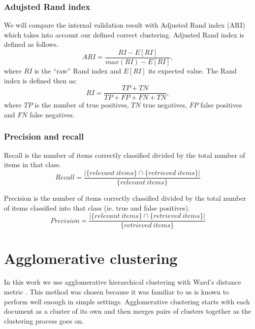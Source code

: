 \subsubsection{Adujsted Rand index}
We will compare the internal validation result with Adjusted Rand 
index (ARI) \cite{hubert_comparing_1985} which takes into account 
our defined correct clustering. Adjusted Rand index is defined as 
follows.
\begin{equation}
 ARI = \frac{RI - E[RI]}{max(RI) - E[RI]},
\end{equation}
where $RI$ is the ``raw'' Rand index and $E[RI]$ its expected
value. The Rand index is defined then as:
\begin{equation}
  RI = \frac{TP + TN}{TP + FP + FN + TN},
\end{equation}
where $TP$ is the number of true positives, $TN$ true negatives, 
$FP$ false positives and $FN$ false negatives.

\subsubsection{Precision and recall}
Recall is the number of items correctly classified divided by the 
total number of items in that class.
\begin{equation}
 Recall = \frac{|\{relevant\ items\} \cap \{retrieved\ items\}|} 
{\{relevant\ items\}}
\end{equation}

Precision is the number of items correctly classified divided by 
the total number of items classified into that class (ie. true and 
false positives).
\begin{equation}
 Precision = \frac{|\{relevant\ items\} \cap \{retrieved\ 
items\}|} 
{\{retrieved\ items\}}
\end{equation}


\section{Agglomerative clustering}
\label{sec:agglomerativeclustering}
In this work we use agglomerative hierarchical clustering with 
Ward's distance metric \cite{ward_jr_hierarchical_1963}. This 
method was chosen because it was familiar to us is known to 
perform well enough in simple settings. 
Agglomerative clustering starts with each document 
as a cluster of its own and then merges pairs of clusters together 
as the clustering process goes on.


